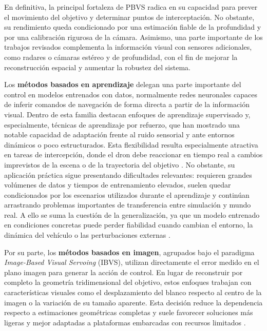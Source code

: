 \vspace{0.3cm}

En definitiva, la principal fortaleza de PBVS radica en su capacidad para prever el movimiento del objetivo y determinar puntos de interceptación. No obstante, su rendimiento queda condicionado por una estimación fiable de la profundidad y por una calibración rigurosa de la cámara. Asimismo, una parte importante de los trabajos revisados complementa la información visual con sensores adicionales, como radares o cámaras estéreo y de profundidad, con el fin de mejorar la reconstrucción espacial y aumentar la robustez del sistema.

\vspace{0.3cm}

Los \textbf{métodos basados en aprendizaje} delegan una parte importante del control en modelos entrenados con datos, normalmente redes neuronales capaces de inferir comandos de navegación de forma directa a partir de la información visual. Dentro de esta familia destacan enfoques de aprendizaje supervisado y, especialmente, técnicas de aprendizaje por refuerzo, que han mostrado una notable capacidad de adaptación frente al ruido sensorial y ante entornos dinámicos o poco estructurados. Esta flexibilidad resulta especialmente atractiva en tareas de intercepción, donde el dron debe reaccionar en tiempo real a cambios imprevistos de la escena o de la trayectoria del objetivo \cite{weber2025autonomous, katkuri2024uav}. No obstante, su aplicación práctica sigue presentando dificultades relevantes: requieren grandes volúmenes de datos y tiempos de entrenamiento elevados, suelen quedar condicionados por los escenarios utilizados durante el aprendizaje y continúan arrastrando problemas importantes de transferencia entre simulación y mundo real. A ello se suma la cuestión de la generalización, ya que un modelo entrenado en condiciones concretas puede perder fiabilidad cuando cambian el entorno, la dinámica del vehículo o las perturbaciones externas \cite{guazzaloca2025learning}.

\vspace{0.3cm}

Por su parte, los \textbf{métodos basados en imagen}, agrupados bajo el paradigma \textit{Image-Based Visual Servoing} (IBVS), utilizan directamente el error medido en el plano imagen para generar la acción de control. En lugar de reconstruir por completo la geometría tridimensional del objetivo, estos enfoques trabajan con características visuales como el desplazamiento del blanco respecto al centro de la imagen o la variación de su tamaño aparente. Esta decisión reduce la dependencia respecto a estimaciones geométricas completas y suele favorecer soluciones más ligeras y mejor adaptadas a plataformas embarcadas con recursos limitados \cite{chaumette2006visual, yang2024high, yan2024precise}.




